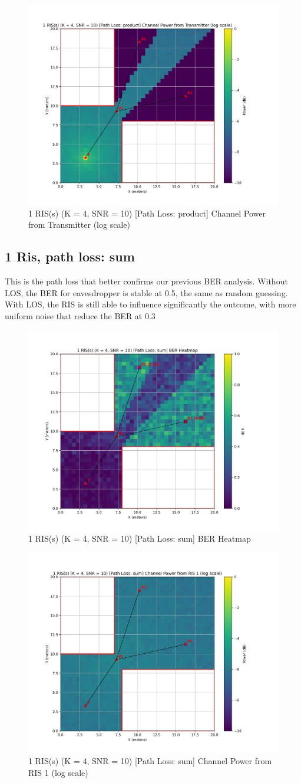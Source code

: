 \begin{figure}[H]
  \centering
  \includegraphics[width=0.45\linewidth]{imgs/heatmap-simulations/1 RIS(s) (K = 4, SNR = 10) [Path Loss_ product] Channel Power from Transmitter (log scale).png}
  \caption{1 RIS(s) (K = 4, SNR = 10) [Path Loss: product] Channel Power from Transmitter (log scale)}
\end{figure}

\subsection*{1 Ris, path loss: sum}
This is the path loss that better confirms our previous BER analysis. Without LOS, the BER for eavesdropper is stable at 0.5, the same as random guessing. With LOS, the RIS is still able to influence significantly the outcome, with more uniform noise that reduce the BER at 0.3

\begin{figure}[H]
  \centering
  \includegraphics[width=0.45\linewidth]{imgs/heatmap-simulations/1 RIS(s) (K = 4, SNR = 10) [Path Loss_ sum] BER Heatmap.png}
  \caption{1 RIS(s) (K = 4, SNR = 10) [Path Loss: sum] BER Heatmap}
\end{figure}

\begin{figure}[H]
  \centering
  \includegraphics[width=0.45\linewidth]{imgs/heatmap-simulations/1 RIS(s) (K = 4, SNR = 10) [Path Loss_ sum] Channel Power from RIS 1 (log scale).png}
  \caption{1 RIS(s) (K = 4, SNR = 10) [Path Loss: sum] Channel Power from RIS 1 (log scale)}
\end{figure}

